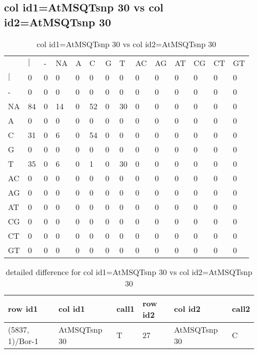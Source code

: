 \subsection{col id1=AtMSQTsnp 30 vs col id2=AtMSQTsnp 30}
\begin{center}
\begin{longtable}{|l|l|l|l|l|l|l|l|l|l|l|l|l|l|}
\caption{col id1=AtMSQTsnp 30 vs col id2=AtMSQTsnp 30} \label{table_dm838}\\
\hline
\\
\hline
&$|$&-&NA&A&C&G&T&AC&AG&AT&CG&CT&GT\\
$|$&0&0&0&0&0&0&0&0&0&0&0&0&0\\
-&0&0&0&0&0&0&0&0&0&0&0&0&0\\
NA&84&0&14&0&52&0&30&0&0&0&0&0&0\\
A&0&0&0&0&0&0&0&0&0&0&0&0&0\\
C&31&0&6&0&54&0&0&0&0&0&0&0&0\\
G&0&0&0&0&0&0&0&0&0&0&0&0&0\\
T&35&0&6&0&1&0&30&0&0&0&0&0&0\\
AC&0&0&0&0&0&0&0&0&0&0&0&0&0\\
AG&0&0&0&0&0&0&0&0&0&0&0&0&0\\
AT&0&0&0&0&0&0&0&0&0&0&0&0&0\\
CG&0&0&0&0&0&0&0&0&0&0&0&0&0\\
CT&0&0&0&0&0&0&0&0&0&0&0&0&0\\
GT&0&0&0&0&0&0&0&0&0&0&0&0&0\\
\hline
\end{longtable}
\end{center}

\begin{center}
\begin{longtable}{|l|l|l|l|l|l|}
\caption{detailed difference for col id1=AtMSQTsnp 30 vs col id2=AtMSQTsnp 30} \label{table_dm839}\\
\hline
row id1&col id1&call1&row id2&col id2&call2\\
\hline
(5837, 1)/Bor-1&AtMSQTsnp 30&T&27&AtMSQTsnp 30&C\\
\hline
\end{longtable}
\end{center}

